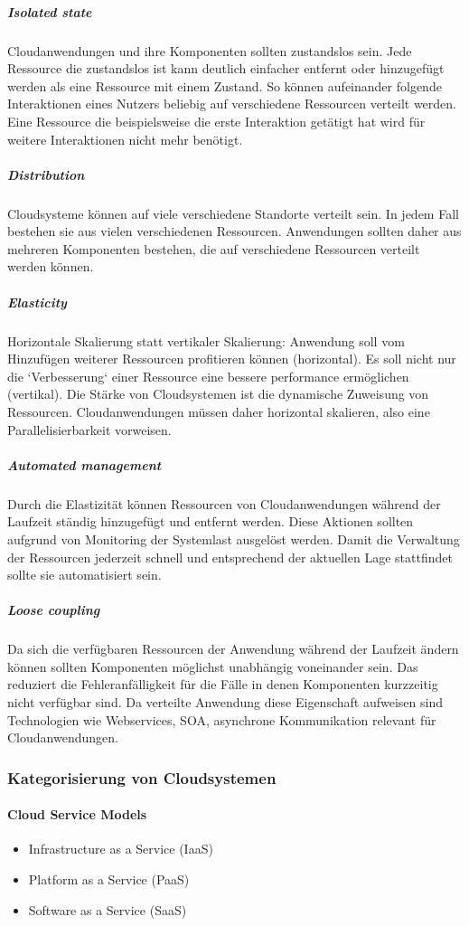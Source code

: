 \documentclass[a4paper,10pt]{article}
\numberwithin{figure}{section}
\numberwithin{table}{section}
\begin{document}
\subparagraph{Isolated state}
Cloudanwendungen und ihre Komponenten sollten zustandslos sein.
Jede Ressource die zustandslos ist kann deutlich einfacher entfernt oder hinzugefügt werden als eine Ressource mit einem Zustand.
So können aufeinander folgende Interaktionen eines Nutzers beliebig auf verschiedene Ressourcen verteilt werden.
Eine Ressource die beispielsweise die erste Interaktion getätigt hat wird für weitere Interaktionen nicht mehr benötigt.
\subparagraph{Distribution}
Cloudsysteme können auf viele verschiedene Standorte verteilt sein.
In jedem Fall bestehen sie aus vielen verschiedenen Ressourcen.
Anwendungen sollten daher aus mehreren Komponenten bestehen, die auf verschiedene Ressourcen verteilt werden können.
\subparagraph{Elasticity}
Horizontale Skalierung statt vertikaler Skalierung:
Anwendung soll vom Hinzufügen weiterer Ressourcen profitieren können (horizontal).
Es soll nicht nur die `Verbesserung` einer Ressource eine bessere performance ermöglichen (vertikal).
Die Stärke von Cloudsystemen ist die dynamische Zuweisung von Ressourcen.
Cloudanwendungen müssen daher horizontal skalieren, also eine Parallelisierbarkeit vorweisen.
\subparagraph{Automated management}
Durch die Elastizität können Ressourcen von Cloudanwendungen während der Laufzeit ständig hinzugefügt und entfernt werden.
Diese Aktionen sollten aufgrund von Monitoring der Systemlast ausgelöst werden.
Damit die Verwaltung der Ressourcen jederzeit schnell und entsprechend der aktuellen Lage stattfindet sollte sie automatisiert sein.
\subparagraph{Loose coupling}
Da sich die verfügbaren Ressourcen der Anwendung während der Laufzeit ändern können sollten Komponenten möglichst unabhängig voneinander sein.
Das reduziert die Fehleranfälligkeit für die Fälle in denen Komponenten kurzzeitig nicht verfügbar sind. 
Da verteilte Anwendung diese Eigenschaft aufweisen sind Technologien wie Webservices, SOA, asynchrone Kommunikation relevant für Cloudanwendungen. 

\subsubsection{Kategorisierung von Cloudsystemen}

\paragraph{Cloud Service Models}

\begin{itemize}
 \item Infrastructure as a Service (IaaS)
 \item Platform as a Service (PaaS)
 \item Software as a Service (SaaS)
\end{itemize}
\end{document}
